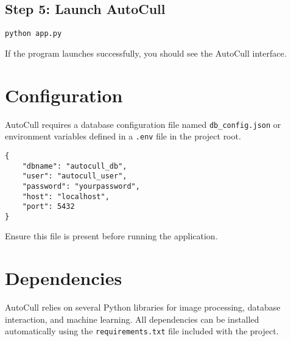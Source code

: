\documentclass[12pt,a4paper]{article}
\begin{document}
\subsection{Step 5: Launch AutoCull}
\begin{lstlisting}[style=console]
python app.py
\end{lstlisting}

If the program launches successfully, you should see the AutoCull interface.


\section{Configuration}

AutoCull requires a database configuration file named \texttt{db\_config.json} or environment variables defined in a \texttt{.env} file in the project root.

\begin{lstlisting}[style=console]
{
    "dbname": "autocull_db",
    "user": "autocull_user",
    "password": "yourpassword",
    "host": "localhost",
    "port": 5432
}
\end{lstlisting}

Ensure this file is present before running the application.


\section{Dependencies}

AutoCull relies on several Python libraries for image processing, database interaction, and machine learning.  
All dependencies can be installed automatically using the \texttt{requirements.txt} file included with the project.
\end{document}
